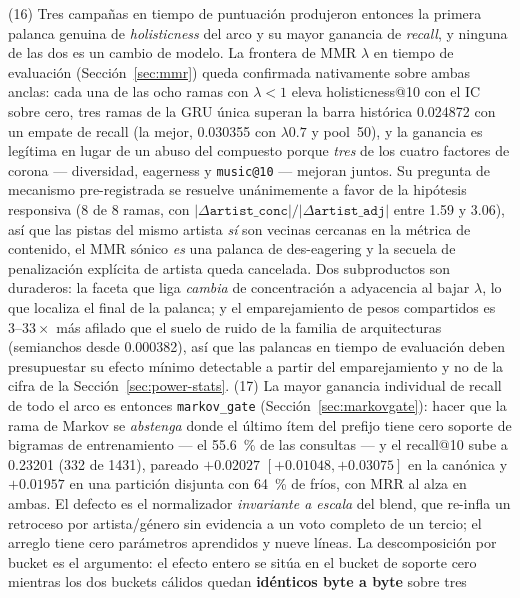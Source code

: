 \documentclass[11pt]{article}
\begin{document}
(16) Tres campañas en tiempo de puntuación produjeron entonces la primera palanca
genuina de \emph{holisticness} del arco y su mayor ganancia de \emph{recall}, y
ninguna de las dos es un cambio de modelo. La frontera de MMR $\lambda$ en tiempo de
evaluación (Sección~\ref{sec:mmr}) queda confirmada nativamente sobre ambas anclas:
cada una de las ocho ramas con $\lambda<1$ eleva holisticness@10 con el IC sobre
cero, tres ramas de la GRU única superan la barra histórica \num{0.024872} con un
empate de recall (la mejor, \num{0.030355} con $\lambda\num{0.7}$ y pool~\num{50}),
y la ganancia es legítima en lugar de un abuso del compuesto porque \emph{tres} de
los cuatro factores de corona --- diversidad, eagerness y \texttt{music@10} ---
mejoran juntos. Su pregunta de mecanismo pre-registrada se resuelve unánimemente a
favor de la hipótesis responsiva (8 de 8 ramas, con
$|\Delta\texttt{artist\_conc}|/|\Delta\texttt{artist\_adj}|$ entre \num{1.59} y
\num{3.06}), así que las pistas del mismo artista \emph{sí} son vecinas cercanas en
la métrica de contenido, el MMR sónico \emph{es} una palanca de des-eagering y la
secuela de penalización explícita de artista queda cancelada. Dos subproductos son
duraderos: la faceta que liga \emph{cambia} de concentración a adyacencia al bajar
$\lambda$, lo que localiza el final de la palanca; y el emparejamiento de pesos
compartidos es $\numrange{3}{33}\times$ más afilado que el suelo de ruido de la
familia de arquitecturas (semianchos desde \num{0.000382}), así que las palancas en
tiempo de evaluación deben presupuestar su efecto mínimo detectable a partir del
emparejamiento y no de la cifra de la Sección~\ref{sec:power-stats}.
(17) La mayor ganancia individual de recall de todo el arco es entonces
\texttt{markov\_gate} (Sección~\ref{sec:markovgate}): hacer que la rama de Markov se
\emph{abstenga} donde el último ítem del prefijo tiene cero soporte de bigramas de
entrenamiento --- el \SI{55.6}{\percent} de las consultas --- y el recall@10 sube a
\num{0.23201} (\num{332} de \num{1431}), pareado $+\num{0.02027}$
$[+\num{0.01048}, +\num{0.03075}]$ en la canónica y $+\num{0.01957}$ en una
partición disjunta con \SI{64}{\percent} de fríos, con MRR al alza en ambas. El
defecto es el normalizador \emph{invariante a escala} del blend, que re-infla un
retroceso por artista/género sin evidencia a un voto completo de un tercio; el
arreglo tiene cero parámetros aprendidos y nueve líneas. La descomposición por
bucket es el argumento: el efecto entero se sitúa en el bucket de soporte cero
mientras los dos buckets cálidos quedan \textbf{idénticos byte a byte} sobre tres
\end{document}
